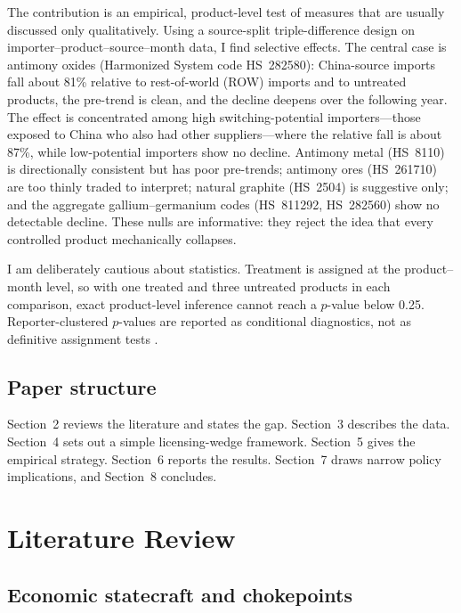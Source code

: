 \documentclass[12pt,a4paper]{article}
\begin{document}
The contribution is an empirical, product-level test of measures that are
usually discussed only qualitatively. Using a source-split triple-difference
design on importer--product--source--month data, I find selective effects. The
central case is antimony oxides (Harmonized System code HS~282580): China-source
imports fall about 81\% relative to rest-of-world (ROW) imports and to untreated
products, the pre-trend is clean, and the decline deepens over the following
year. The effect is concentrated among high switching-potential importers---those
exposed to China who also had other suppliers---where the relative fall is about
87\%, while low-potential importers show no decline. Antimony metal (HS~8110) is
directionally consistent but has poor pre-trends; antimony ores (HS~261710) are
too thinly traded to interpret; natural graphite (HS~2504) is suggestive only;
and the aggregate gallium--germanium codes (HS~811292, HS~282560) show no
detectable decline. These nulls are informative: they reject the idea that every
controlled product mechanically collapses.

I am deliberately cautious about statistics. Treatment is assigned at the
product--month level, so with one treated and three untreated products in each
comparison, exact product-level inference cannot reach a $p$-value below 0.25.
Reporter-clustered $p$-values are reported as conditional diagnostics, not as
definitive assignment tests \citep{roth2022pretest}.

\subsection{Paper structure}

Section~2 reviews the literature and states the gap. Section~3 describes the
data. Section~4 sets out a simple licensing-wedge framework. Section~5 gives the
empirical strategy. Section~6 reports the results. Section~7 draws narrow policy
implications, and Section~8 concludes.

\section{Literature Review}\label{sec:lit}

\subsection{Economic statecraft and chokepoints}
\end{document}
